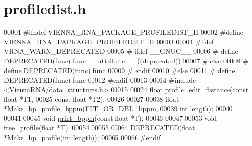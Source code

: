 \hypertarget{profiledist_8h_source}{}\section{profiledist.\+h}
\label{profiledist_8h_source}

\begin{DoxyCode}
00001 \textcolor{preprocessor}{#ifndef VIENNA\_RNA\_PACKAGE\_PROFILEDIST\_H}
00002 \textcolor{preprocessor}{#define VIENNA\_RNA\_PACKAGE\_PROFILEDIST\_H}
00003 
00004 \textcolor{preprocessor}{#ifdef VRNA\_WARN\_DEPRECATED}
00005 \textcolor{preprocessor}{# ifdef \_\_GNUC\_\_}
00006 \textcolor{preprocessor}{#  define DEPRECATED(func) func \_\_attribute\_\_ ((deprecated))}
00007 \textcolor{preprocessor}{# else}
00008 \textcolor{preprocessor}{#  define DEPRECATED(func) func}
00009 \textcolor{preprocessor}{# endif}
00010 \textcolor{preprocessor}{#else}
00011 \textcolor{preprocessor}{# define DEPRECATED(func) func}
00012 \textcolor{preprocessor}{#endif}
00013 
00014 \textcolor{preprocessor}{#include <\hyperlink{data__structures_8h}{ViennaRNA/data\_structures.h}>}
00015 
00024 \textcolor{keywordtype}{float} \hyperlink{profiledist_8h_abe75e90e00a1e5dd8862944ed53dad5d}{profile\_edit\_distance}(\textcolor{keyword}{const} \textcolor{keywordtype}{float} *T1,
00025                             \textcolor{keyword}{const} \textcolor{keywordtype}{float} *T2);
00026 
00027 
00038 \textcolor{keywordtype}{float} *\hyperlink{profiledist_8h_a3dff26e707a2a2e65a0f759caabde6e7}{Make\_bp\_profile\_bppm}(\hyperlink{group__data__structures_ga31125aeace516926bf7f251f759b6126}{FLT\_OR\_DBL}  *bppm,
00039                             \textcolor{keywordtype}{int}         length);
00040 
00041 
00045 \textcolor{keywordtype}{void}  \hyperlink{profiledist_8h_a8e0b4fe3698b3502945116ecc0ba6160}{print\_bppm}(\textcolor{keyword}{const} \textcolor{keywordtype}{float} *T);
00046 
00047 
00053 \textcolor{keywordtype}{void}  \hyperlink{profiledist_8h_a9b0b84a5a45761bf42d7c835dcdb3b85}{free\_profile}(\textcolor{keywordtype}{float} *T);
00054 
00055 
00064 DEPRECATED(\textcolor{keywordtype}{float} *\hyperlink{profiledist_8h_a904c7eaf4a2413567c00ac4891749d18}{Make\_bp\_profile}(\textcolor{keywordtype}{int} length));
00065 
00066 \textcolor{preprocessor}{#endif}
\end{DoxyCode}
